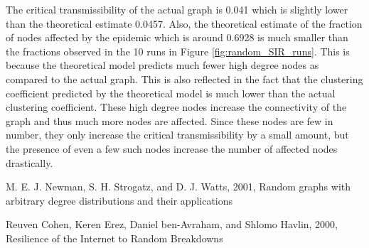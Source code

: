 \documentclass{article}
\begin{document}
\begin{enumerate}
\begin{enumerate}
\end{enumerate}

The critical transmissibility of the actual graph is 0.041 which is slightly lower than the theoretical estimate 0.0457. Also, the theoretical estimate of the fraction of nodes affected by the epidemic which is around 0.6928 is much smaller than the fractions observed in the 10 runs in Figure \ref{fig:random_SIR_runs}. This is because the theoretical model predicts much fewer high degree nodes as  compared to the actual graph. This is also reflected in the fact that the clustering coefficient predicted by the theoretical model is much lower than the actual clustering coefficient. These high degree nodes increase the connectivity of the graph and thus much more nodes are affected. Since these nodes are few in number, they only increase the critical transmissibility by a small amount, but the presence of even a few such nodes increase the number of affected nodes drastically.

\end{enumerate}

\begin{thebibliography}{2}

 M. E. J. Newman, S. H. Strogatz, and D. J. Watts, 2001, Random graphs with arbitrary degree distributions and their applications

 Reuven Cohen, Keren Erez, Daniel ben-Avraham, and Shlomo Havlin, 2000, Resilience of the Internet to Random Breakdowns

\end{thebibliography}
\end{document}
